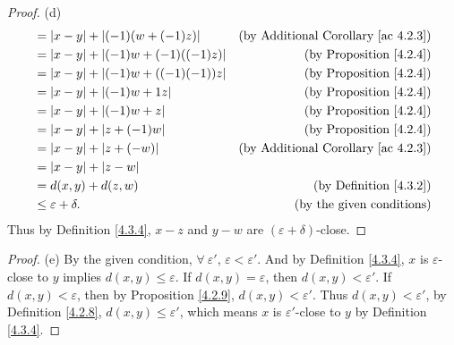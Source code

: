 \begin{proof}{(d)}
\begin{align*}
&= |x - y| + |(-1)(w + (-1)z)| & \text{(by Additional Corollary \ref{ac 4.2.3})} \\
&= |x - y| + |(-1)w + (-1)((-1)z)| & \text{(by Proposition \ref{4.2.4})} \\
&= |x - y| + |(-1)w + ((-1)(-1))z| & \text{(by Proposition \ref{4.2.4})} \\
&= |x - y| + |(-1)w + 1z| & \text{(by Proposition \ref{4.2.4})} \\
&= |x - y| + |(-1)w + z| & \text{(by Proposition \ref{4.2.4})} \\
&= |x - y| + |z + (-1)w| & \text{(by Proposition \ref{4.2.4})} \\
&= |x - y| + |z + (-w)| & \text{(by Additional Corollary \ref{ac 4.2.3})} \\
&= |x - y| + |z - w| \\
&= d(x, y) + d(z, w) & \text{(by Definition \ref{4.3.2})} \\
&\leq \varepsilon + \delta. & \text{(by the given conditions)}
\end{align*}
Thus by Definition \ref{4.3.4}, \(x - z\) and \(y - w\) are \((\varepsilon + \delta)\)-close.
\end{proof}

\begin{proof}{(e)}
By the given condition, \(\forall\ \varepsilon'\), \(\varepsilon < \varepsilon'\).
And by Definition \ref{4.3.4}, \(x\) is \(\varepsilon\)-close to \(y\) implies \(d(x, y) \leq \varepsilon\).
If \(d(x, y) = \varepsilon\), then \(d(x, y) < \varepsilon'\).
If \(d(x, y) < \varepsilon\), then by Proposition \ref{4.2.9}, \(d(x, y) < \varepsilon'\).
Thus \(d(x, y) < \varepsilon'\), by Definition \ref{4.2.8}, \(d(x, y) \leq \varepsilon'\), which means \(x\) is \(\varepsilon'\)-close to \(y\) by Definition \ref{4.3.4}.
\end{proof}

